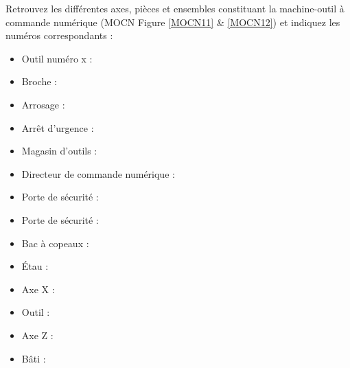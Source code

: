 \documentclass[12pt]{article}
\newcounter{exo}
\newenvironment{exo}{\stepcounter{exo}\vspace{0.5cm}{\bfseries Question \theexo\ :}}{\par\vspace{0.5cm}}
\begin{document}
\begin{exo}\label{exo1} Retrouvez les différentes axes, pièces et ensembles constituant la machine-outil à commande numérique (MOCN Figure \ref{MOCN11} \& \ref{MOCN12}) et indiquez les numéros correspondants :\\ \end{exo}
\begin{minipage}{.55\linewidth}
\begin{itemize}
    \item Outil numéro x :
    \item Broche :
    \item Arrosage :
    \item Arrêt d’urgence :
    \item Magasin d’outils :
    \item Directeur de commande numérique :
    \item Porte de sécurité :
\end{itemize}

\end{minipage}
\begin{minipage}{.44\linewidth}
\begin{itemize}
    \item Porte de sécurité :
    \item Bac à copeaux :
    \item Étau :
    \item Axe X :
    \item Outil :
    \item Axe Z :
    \item Bâti :
\end{itemize}
\end{minipage}
\end{document}
